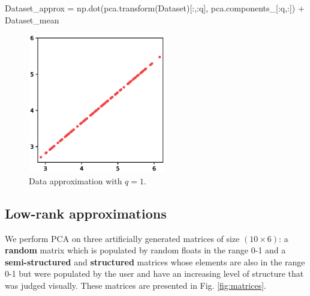 \documentclass[10pt,twocolumn]{article}
\begin{document}
\begin{python}
Dataset_approx = 
np.dot(pca.transform(Dataset)[:,:q], 
pca.components_[:q,:]) + Dataset_mean
\end{python}

\begin{figure}[H]
\centering\includegraphics[width=6cm]{python-data-approximation.eps}
\caption{Data approximation with $q = 1$.}
\label{fig:python-data-approximation}
\end{figure}



\newpage

\subsection{Low-rank approximations}

We perform PCA on three artificially generated matrices of size $(10 \times 6)$: a \textbf{random} matrix which is populated by random floats in the range 0-1 and a \textbf{semi-structured} and \textbf{structured} matrices whose elements are also in the range 0-1 but were populated by the user and have an increasing level of structure that was judged visually. These matrices are presented in Fig. \ref{fig:matrices}.
\end{document}
